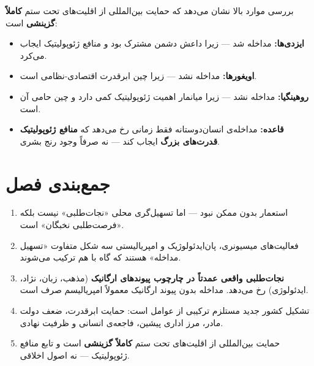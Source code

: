 \begin{tcolorbox}[enemybox, title={نتیجه‌ی تلخ: گزینشی‌بودن حمایت بین‌المللی}]
بررسی موارد بالا نشان می‌دهد که حمایت بین‌المللی از اقلیت‌های تحت ستم \textbf{کاملاً گزینشی} است:
\begin{itemize}[nosep, rightmargin=1em]
  \item \textbf{ایزدی‌ها:} مداخله شد — زیرا داعش دشمن مشترک بود و منافع ژئوپولیتیک ایجاب می‌کرد.
  \item \textbf{اویغورها:} مداخله نشد — زیرا چین ابرقدرت اقتصادی-نظامی است.
  \item \textbf{روهینگیا:} مداخله نشد — زیرا میانمار اهمیت ژئوپولیتیک کمی دارد و چین حامی آن است.
  \item \textbf{قاعده:} مداخله‌ی انسان‌دوستانه فقط زمانی رخ می‌دهد که \textbf{منافع ژئوپولیتیک قدرت‌های بزرگ} ایجاب کند — نه صرفاً وجود رنج بشری.
\end{itemize}
\end{tcolorbox}

\section{جمع‌بندی فصل}
\label{sec:ch09-summary}

\begin{tcolorbox}[wavebox, title={یافته‌های کلیدی فصل ۹}]
\begin{enumerate}[nosep, label=\textbf{\arabic*.}]
  \item استعمار بدون  ممکن نبود — اما تسهیل‌گری محلی «نجات‌طلبی» نیست بلکه «فرصت‌طلبی نخبگان» است.

  \item فعالیت‌های میسیونری، پان‌ایدئولوژیک و امپریالیستی سه شکل متفاوت «تسهیل مداخله» هستند که گاه با هم ترکیب می‌شوند.

  \item \textbf{نجات‌طلبی واقعی عمدتاً در چارچوب پیوندهای ارگانیک} (مذهب، زبان، نژاد، ایدئولوژی) رخ می‌دهد. مداخله بدون پیوند ارگانیک معمولاً امپریالیسم صرف است.

  \item تشکیل کشور جدید مستلزم ترکیبی از عوامل است: حمایت ابرقدرت، ضعف دولت مادر، مرز اداری پیشین، فاجعه‌ی انسانی و ظرفیت نهادی.

  \item حمایت بین‌المللی از اقلیت‌های تحت ستم \textbf{کاملاً گزینشی} است و تابع منافع ژئوپولیتیک — نه اصول اخلاقی.
\end{enumerate}
\end{tcolorbox}

\cleardoublepage